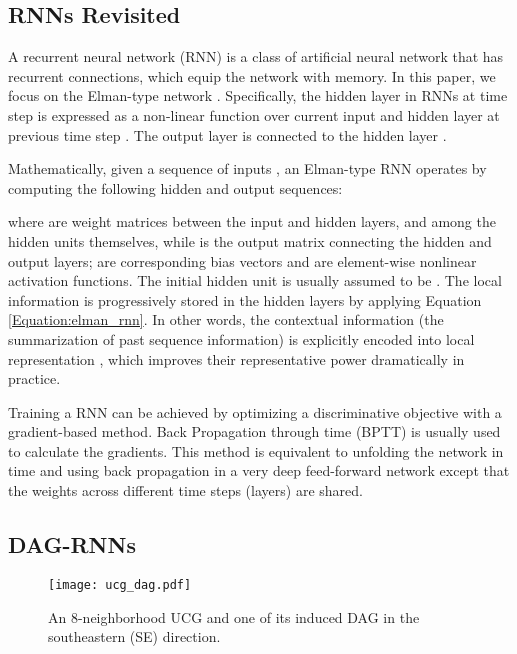 \documentclass[10pt,twocolumn,letterpaper]{article}
\begin{document}
\subsection{RNNs Revisited}
\label{Section:1d_rnn}
A recurrent neural network (RNN) is a class of artificial neural network that has recurrent connections, which equip the network with memory.
In this paper, we focus on the Elman-type network \cite{elman1990finding}.
Specifically, the hidden layer  in RNNs at time step  is expressed as a non-linear function over current input  and hidden layer at previous time step . The output layer  is connected to the hidden layer .


Mathematically, given a sequence of inputs , an Elman-type RNN operates by computing the following hidden and output sequences:


where  are weight matrices between the input and hidden layers, and among the hidden units themselves, while  is the output matrix connecting the hidden and output layers;  are corresponding bias vectors and  are element-wise nonlinear activation functions. The initial hidden unit  is usually assumed to be . The local information  is progressively stored in the hidden layers by applying Equation \ref{Equation:elman_rnn}. In other words, the contextual information (the summarization of past sequence information) is explicitly encoded into local representation , which improves their representative power dramatically in practice.

Training a RNN can be achieved by optimizing a discriminative objective with a gradient-based method. Back Propagation through time (BPTT) \cite{werbos1990backpropagation} is usually used to calculate the gradients. This method is equivalent to unfolding the network in time and using back propagation in a very deep feed-forward network except that the weights across different time steps (layers) are shared.

\subsection{DAG-RNNs}
\label{Section:dag_rnn}



\label{Section:quaddirectionality}
\begin{figure}[t]
\centering
\texttt{[image: ucg\_dag.pdf]}
\caption{An 8-neighborhood UCG and one of its induced DAG in the southeastern (SE) direction.}
\label{Figure:ucg_dag}
\end{figure}
\end{document}
